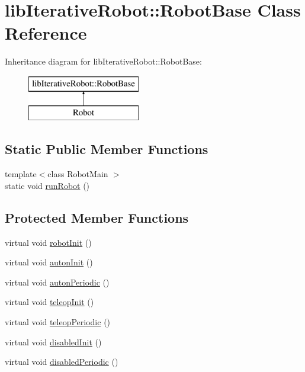 \hypertarget{classlib_iterative_robot_1_1_robot_base}{}\section{lib\+Iterative\+Robot\+::Robot\+Base Class Reference}
\label{classlib_iterative_robot_1_1_robot_base}
Inheritance diagram for lib\+Iterative\+Robot\+::Robot\+Base\+:\begin{figure}[H]
\begin{center}
\leavevmode
\includegraphics[height=2.000000cm]{classlib_iterative_robot_1_1_robot_base}
\end{center}
\end{figure}
\subsection*{Static Public Member Functions}
\begin{DoxyCompactItemize}
\item 
{\footnotesize template$<$class Robot\+Main $>$ }\\static void \mbox{\hyperlink{classlib_iterative_robot_1_1_robot_base_a5a57c611cc6c2444e1c8d2fd514bd25c}{run\+Robot}} ()
\end{DoxyCompactItemize}
\subsection*{Protected Member Functions}
\begin{DoxyCompactItemize}
\item 
virtual void \mbox{\hyperlink{classlib_iterative_robot_1_1_robot_base_a1e690e472e901ac99bb7ce6f3b6a33ea}{robot\+Init}} ()
\item 
virtual void \mbox{\hyperlink{classlib_iterative_robot_1_1_robot_base_a8137d84aef11ed00a46cbc1bbb727a60}{auton\+Init}} ()
\item 
virtual void \mbox{\hyperlink{classlib_iterative_robot_1_1_robot_base_ac34d3dcb9388d4a8564eb781919eb825}{auton\+Periodic}} ()
\item 
virtual void \mbox{\hyperlink{classlib_iterative_robot_1_1_robot_base_a290bea17acf9bc884a490472e9d2e039}{teleop\+Init}} ()
\item 
virtual void \mbox{\hyperlink{classlib_iterative_robot_1_1_robot_base_a564ee86d582b598dd0713c067b352aef}{teleop\+Periodic}} ()
\item 
virtual void \mbox{\hyperlink{classlib_iterative_robot_1_1_robot_base_a12cfc52a6bac5b5a9ad7e61b47e9ecd2}{disabled\+Init}} ()
\item 
virtual void \mbox{\hyperlink{classlib_iterative_robot_1_1_robot_base_a8e1e85e215343baaaf3bdeedb89d9890}{disabled\+Periodic}} ()
\end{DoxyCompactItemize}


